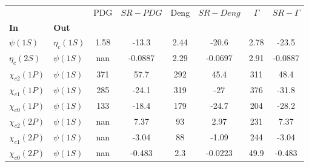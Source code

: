 \begin{tabular}{l|l|c|c|c|c|c|c}
\toprule
                &            &  PDG & $SR-PDG$ &  Deng & $SR-Deng$ &  $\Gamma$ & $SR-\Gamma$ \\
\textbf{In} & \textbf{Out} &      &          &       &           &           &             \\
\midrule
\textbf{$\psi(1S)$} & \textbf{$\eta_{c}(1S)$} & 1.58 &    -13.3 &  2.44 &     -20.6 &      2.78 &       -23.5 \\
\textbf{$\eta_{c}(2S)$} & \textbf{$\psi(1S)$} &  nan &  -0.0887 &  2.29 &   -0.0697 &      2.91 &     -0.0887 \\
\textbf{$\chi_{c2}(1P)$} & \textbf{$\psi(1S)$} &  371 &     57.7 &   292 &      45.4 &       311 &        48.4 \\
\textbf{$\chi_{c1}(1P)$} & \textbf{$\psi(1S)$} &  285 &    -24.1 &   319 &       -27 &       376 &       -31.8 \\
\textbf{$\chi_{c0}(1P)$} & \textbf{$\psi(1S)$} &  133 &    -18.4 &   179 &     -24.7 &       204 &       -28.2 \\
\textbf{$\chi_{c2}(2P)$} & \textbf{$\psi(1S)$} &  nan &     7.37 &    93 &      2.97 &       231 &        7.37 \\
\textbf{$\chi_{c1}(2P)$} & \textbf{$\psi(1S)$} &  nan &    -3.04 &    88 &     -1.09 &       244 &       -3.04 \\
\textbf{$\chi_{c0}(2P)$} & \textbf{$\psi(1S)$} &  nan &   -0.483 &   2.3 &   -0.0223 &      49.9 &      -0.483 \\
\bottomrule
\end{tabular}
